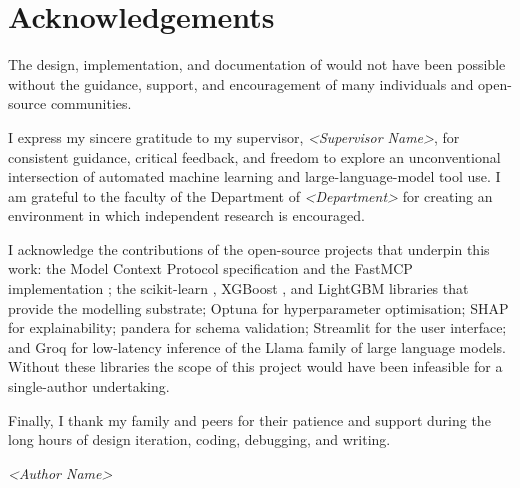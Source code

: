 \chapter*{Acknowledgements}

The design, implementation, and documentation of \projname{} would not have
been possible without the guidance, support, and encouragement of many
individuals and open-source communities.

I express my sincere gratitude to my supervisor,
\emph{\textless Supervisor Name\textgreater}, for consistent guidance,
critical feedback, and freedom to explore an unconventional intersection of
automated machine learning and large-language-model tool use. I am grateful
to the faculty of the Department of \emph{\textless Department\textgreater}
for creating an environment in which independent research is encouraged.

I acknowledge the contributions of the open-source projects that underpin
this work: the Model Context Protocol specification and the FastMCP
implementation \citep{mcpSpec2024, fastmcp}; the scikit-learn
\citep{sklearn2011}, XGBoost \citep{chen2016xgboost}, and LightGBM
\citep{ke2017lightgbm} libraries that provide the modelling substrate;
Optuna \citep{akiba2019optuna} for hyperparameter optimisation; SHAP
\citep{lundberg2017shap} for explainability; pandera \citep{pandera} for
schema validation; Streamlit \citep{streamlit} for the user interface; and
Groq \citep{groq} for low-latency inference of the Llama family
\citep{llama3card} of large language models. Without these libraries the
scope of this project would have been infeasible for a single-author
undertaking.

Finally, I thank my family and peers for their patience and support during
the long hours of design iteration, coding, debugging, and writing.

\vspace{2cm}
\hfill \emph{\textless Author Name\textgreater}
\clearpage
